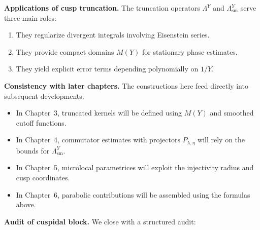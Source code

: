 \medskip

\noindent\textbf{Applications of cusp truncation.}
The truncation operators $\Lambda^{Y}$ and $\Lambda^{Y}_{\mathrm{sm}}$ serve three main roles:
\begin{enumerate}
  \item They regularize divergent integrals involving Eisenstein series.
  \item They provide compact domains $M(Y)$ for stationary phase estimates.
  \item They yield explicit error terms depending polynomially on $1/Y$.
\end{enumerate}

\medskip

\noindent\textbf{Consistency with later chapters.}
The constructions here feed directly into subsequent developments:
\begin{itemize}
  \item In Chapter~3, truncated kernels will be defined using $M(Y)$ and smoothed cutoff functions.
  \item In Chapter~4, commutator estimates with projectors $P_{\lambda,\eta}$ will rely on the bounds for $\Lambda^{Y}_{\mathrm{sm}}$.
  \item In Chapter~5, microlocal parametrices will exploit the injectivity radius and cusp coordinates.
  \item In Chapter~6, parabolic contributions will be assembled using the formulas above.
\end{itemize}

\medskip

\noindent\textbf{Audit of cuspidal block.}
We close with a structured audit:

